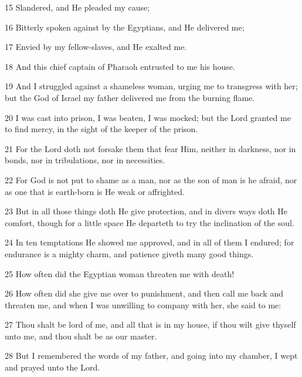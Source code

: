 \par 15 Slandered, and He pleaded my cause;

\par 16 Bitterly spoken against by the Egyptians, and He delivered me;

\par 17 Envied by my fellow-slaves, and He exalted me.

\par 18 And this chief captain of Pharaoh entrusted to me his house.

\par 19 And I struggled against a shameless woman, urging me to transgress with her; but the God of Israel my father delivered me from the burning flame.

\par 20 I was cast into prison, I was beaten, I was mocked; but the Lord granted me to find mercy, in the sight of the keeper of the prison.

\par 21 For the Lord doth not forsake them that fear Him, neither in darkness, nor in bonds, nor in tribulations, nor in necessities.

\par 22 For God is not put to shame as a man, nor as the son of man is he afraid, nor as one that is earth-born is He weak or affrighted.

\par 23 But in all those things doth He give protection, and in divers ways doth He comfort, though for a little space He departeth to try the inclination of the soul.

\par 24 In ten temptations He showed me approved, and in all of them I endured; for endurance is a mighty charm, and patience giveth many good things.

\par 25 How often did the Egyptian woman threaten me with death!

\par 26 How often did she give me over to punishment, and then call me back and threaten me, and when I was unwilling to company with her, she said to me:

\par 27 Thou shalt be lord of me, and all that is in my house, if thou wilt give thyself unto me, and thou shalt be as our master.

\par 28 But I remembered the words of my father, and going into my chamber, I wept and prayed unto the Lord.

